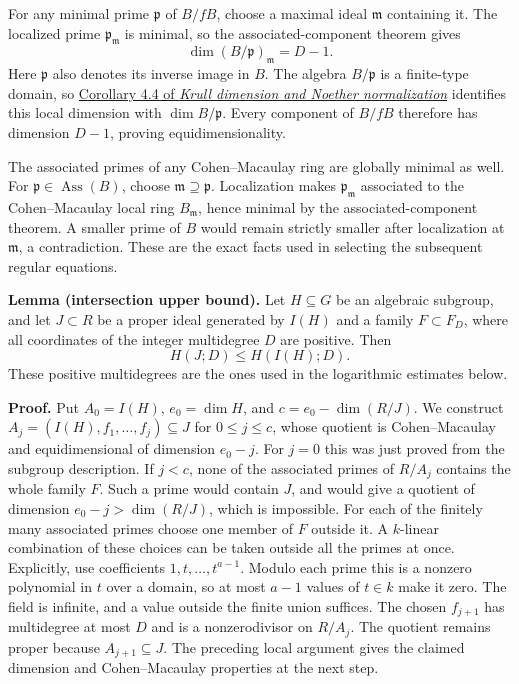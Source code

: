 \documentclass[
  11pt,
  a4paper,
]{article}
\begin{document}
For any minimal prime \(\mathfrak p\) of \(B/fB\), choose a maximal
ideal \(\mathfrak m\) containing it. The localized prime
\(\mathfrak p_{\mathfrak m}\) is minimal, so the associated-component
theorem gives \[
\dim(B/\mathfrak p)_{\mathfrak m}=D-1.
\] Here \(\mathfrak p\) also denotes its inverse image in \(B\). The
algebra \(B/\mathfrak p\) is a finite-type domain, so
\href{https://kokunoyumeto.github.io/open-math-courses-public/courses/AG-CA/krull-dimension-and-noether-normalization.html\#4-parameters-measure-dimension-and-height}{Corollary
4.4 of \emph{Krull dimension and Noether normalization}} identifies this
local dimension with \(\dim B/\mathfrak p\). Every component of \(B/fB\)
therefore has dimension \(D-1\), proving equidimensionality.

The associated primes of any Cohen--Macaulay ring are globally minimal
as well. For \(\mathfrak p\in\operatorname{Ass}(B)\), choose
\(\mathfrak m\supseteq\mathfrak p\). Localization makes
\(\mathfrak p_{\mathfrak m}\) associated to the Cohen--Macaulay local
ring \(B_{\mathfrak m}\), hence minimal by the associated-component
theorem. A smaller prime of \(B\) would remain strictly smaller after
localization at \(\mathfrak m\), a contradiction. These are the exact
facts used in selecting the subsequent regular equations.

\textbf{Lemma (intersection upper bound).} Let \(H\subseteq G\) be an
algebraic subgroup, and let \(J\subset R\) be a proper ideal generated
by \(I(H)\) and a family \(F\subset F_D\), where all coordinates of the
integer multidegree \(D\) are positive. Then \[
H(J;D)\le H(I(H);D).
\tag{8.65}
\] These positive multidegrees are the ones used in the logarithmic
estimates below.

\textbf{Proof.} Put \(A_0=I(H)\), \(e_0=\dim H\), and
\(c=e_0-\dim(R/J)\). We construct
\(A_j=(I(H),f_1,\ldots,f_j)\subseteq J\) for \(0\le j\le c\), whose
quotient is Cohen--Macaulay and equidimensional of dimension \(e_0-j\).
For \(j=0\) this was just proved from the subgroup description. If
\(j<c\), none of the associated primes of \(R/A_j\) contains the whole
family \(F\). Such a prime would contain \(J\), and would give a
quotient of dimension \(e_0-j>\dim(R/J)\), which is impossible. For each
of the finitely many associated primes choose one member of \(F\)
outside it. A \(k\)-linear combination of these choices can be taken
outside all the primes at once. Explicitly, use coefficients
\(1,t,\ldots,t^{a-1}\). Modulo each prime this is a nonzero polynomial
in \(t\) over a domain, so at most \(a-1\) values of \(t\in k\) make it
zero. The field is infinite, and a value outside the finite union
suffices. The chosen \(f_{j+1}\) has multidegree at most \(D\) and is a
nonzerodivisor on \(R/A_j\). The quotient remains proper because
\(A_{j+1}\subseteq J\). The preceding local argument gives the claimed
dimension and Cohen--Macaulay properties at the next step.
\end{document}
